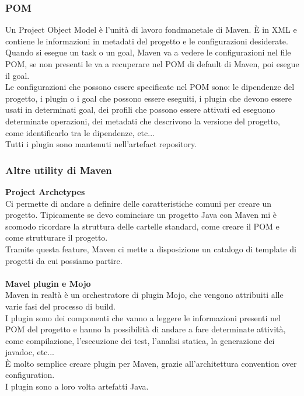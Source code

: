 \documentclass[10pt, a4paper]{article}
\begin{document}
\subsubsection{POM}
Un Project Object Model è l'unità di lavoro fondmanetale di Maven. È in XML e contiene le informazioni in metadati del progetto e le configurazioni desiderate.\\
Quando si esegue un task o un goal, Maven va a vedere le configurazioni nel file POM, se non presenti le va a recuperare nel POM di default di Maven, poi esegue il goal.\\
Le configurazioni che possono essere specificate nel POM sono: le dipendenze del progetto, i plugin o i goal che possono essere eseguiti, i plugin che devono essere usati in determinati goal, dei profili che possono essere attivati ed eseguono determinate operazioni, dei metadati che descrivono la versione del progetto, come identificarlo tra le dipendenze, etc...\\
Tutti i plugin sono mantenuti nell'artefact repository.\\

\subsubsection{Altre utility di Maven}
\textbf{Project Archetypes}\\
Ci permette di andare a definire delle caratteristiche comuni per creare un progetto. Tipicamente se devo cominciare un progetto Java con Maven mi è scomodo ricordare la struttura delle cartelle standard, come creare il POM e come strutturare il progetto.\\
Tramite questa feature, Maven ci mette a disposizione un catalogo di template di progetti da cui possiamo partire.\\\\
\textbf{Mavel plugin e Mojo}\\
Maven in realtà è un orchestratore di plugin Mojo, che vengono attribuiti alle varie fasi del processo di build.\\
I plugin sono dei componenti che vanno a leggere le informazioni presenti nel POM del progetto e hanno la possibilità di andare a fare determinate attività, come compilazione, l'esecuzione dei test, l'analisi statica, la generazione dei javadoc, etc...\\
È molto semplice creare plugin per Maven, grazie all'architettura convention over configuration.\\
I plugin sono a loro volta artefatti Java.
\end{document}
